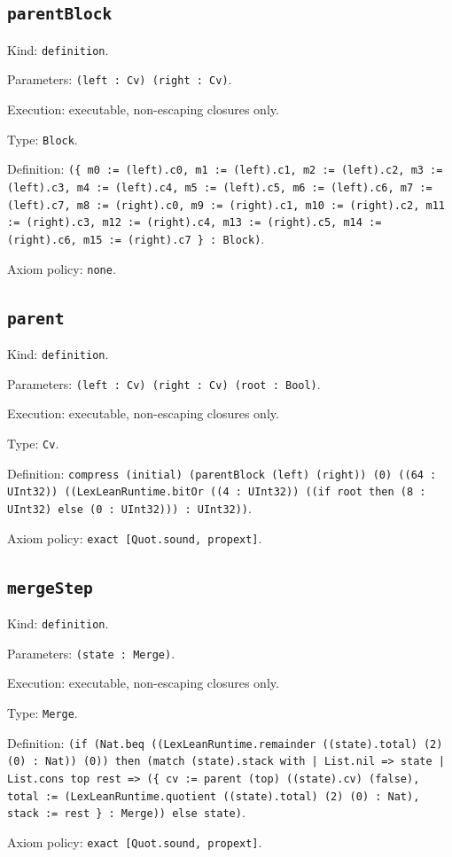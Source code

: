 \documentclass[11pt]{article}
\begin{document}
\subsection*{\texttt{parentBlock}}
\noindent Kind: \texttt{definition}.\par
\noindent Parameters: \texttt{(left : Cv) (right : Cv)}.\par
\noindent Execution: executable, non-escaping closures only.\par
\noindent Type: \texttt{Block}.\par
\noindent Definition: \texttt{(\{ m0 := (left).c0, m1 := (left).c1, m2 := (left).c2, m3 := (left).c3, m4 := (left).c4, m5 := (left).c5, m6 := (left).c6, m7 := (left).c7, m8 := (right).c0, m9 := (right).c1, m10 := (right).c2, m11 := (right).c3, m12 := (right).c4, m13 := (right).c5, m14 := (right).c6, m15 := (right).c7 \} : Block)}.\par
\noindent Axiom policy: \texttt{none}.\par
\subsection*{\texttt{parent}}
\noindent Kind: \texttt{definition}.\par
\noindent Parameters: \texttt{(left : Cv) (right : Cv) (root : Bool)}.\par
\noindent Execution: executable, non-escaping closures only.\par
\noindent Type: \texttt{Cv}.\par
\noindent Definition: \texttt{compress (initial) (parentBlock (left) (right)) (0) ((64 : UInt32)) ((LexLeanRuntime.bitOr ((4 : UInt32)) ((if root then (8 : UInt32) else (0 : UInt32))) : UInt32))}.\par
\noindent Axiom policy: \texttt{exact [Quot.sound, propext]}.\par
\subsection*{\texttt{mergeStep}}
\noindent Kind: \texttt{definition}.\par
\noindent Parameters: \texttt{(state : Merge)}.\par
\noindent Execution: executable, non-escaping closures only.\par
\noindent Type: \texttt{Merge}.\par
\noindent Definition: \texttt{(if (Nat.beq ((LexLeanRuntime.remainder ((state).total) (2) (0) : Nat)) (0)) then (match (state).stack with | List.nil => state | List.cons top rest => (\{ cv := parent (top) ((state).cv) (false), total := (LexLeanRuntime.quotient ((state).total) (2) (0) : Nat), stack := rest \} : Merge)) else state)}.\par
\noindent Axiom policy: \texttt{exact [Quot.sound, propext]}.\par
\end{document}
